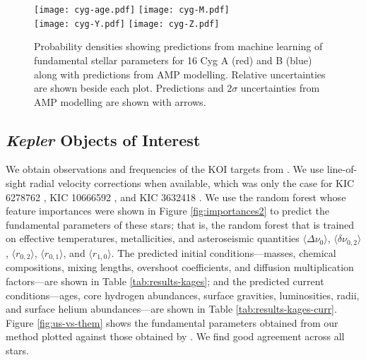 \documentclass[manuscript,linenumbers]{aastex6}
\newif\ifref
\newcommand{\mb}[1]{\ifref\boldmath\textbf{#1}\unboldmath\else #1\fi}
\begin{document}
\begin{figure*}
    \centering
    \texttt{[image: cyg-age.pdf]}\hfill
    \texttt{[image: cyg-M.pdf]}\\
    \texttt{[image: cyg-Y.pdf]}\hfill
    \texttt{[image: cyg-Z.pdf]}
    \caption{Probability densities showing predictions from machine learning of fundamental stellar parameters for 16 Cyg A (red) and B (blue) \mb{along with} predictions from AMP modelling. Relative uncertainties are shown beside each plot. Predictions and $2\sigma$ uncertainties from AMP modelling are shown with arrows. \vspace*{5mm}
    \label{fig:16Cyg-hist}}
\end{figure*}


\subsection{\emph{Kepler} Objects of Interest}
\label{sec:koi}
We obtain observations and frequencies of the KOI targets from \citet{2016MNRAS.456.2183D}. We use line-of-sight radial velocity corrections when available, which was only the case for KIC 6278762 \citep{2002AJ....124.1144L}, KIC 10666592 \citep{2013AA...554A..84M}, and KIC 3632418 \citep{2006AstL...32..759G}. We use the random forest whose feature importances were shown in Figure \ref{fig:importances2} to predict the fundamental \mb{parameters} of these stars; that is, the random forest that is trained on effective temperatures, metallicities, and asteroseismic quantities $\langle \Delta\nu_0 \rangle$, $\langle \delta\nu_{0,2} \rangle$, $\langle r_{0,2} \rangle$, $\langle r_{0,1} \rangle$, and $\langle r_{1,0} \rangle$. The predicted initial conditions---masses, chemical compositions, mixing lengths, overshoot coefficients, and diffusion \mb{multiplication} factors---are shown in Table \ref{tab:results-kages}; and the predicted current conditions---ages, core hydrogen abundances, surface gravities, luminosities, radii, and surface helium abundances---are shown in Table \ref{tab:results-kages-curr}. Figure \ref{fig:us-vs-them} shows the fundamental parameters obtained from our method plotted against those obtained by \citet[hereinafter KAGES]{2015MNRAS.452.2127S}. We find good agreement across all stars. 
\end{document}
